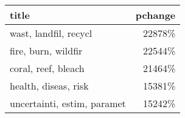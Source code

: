 \begin{tabular}{p{1.2cm}r}
\toprule
                       title &  pchange \\
\midrule
       wast, landfil, recycl &   22878\% \\
         fire, burn, wildfir &   22544\% \\
         coral, reef, bleach &   21464\% \\
        health, diseas, risk &   15381\% \\
 uncertainti, estim, paramet &   15242\% \\
\bottomrule
\end{tabular}
